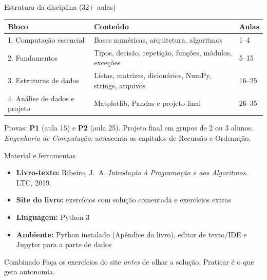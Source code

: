 \documentclass[aspectratio=169,10pt,t]{beamer}
\begin{document}
\begin{frame}{Estrutura da disciplina (32+ aulas)}
  \centering
  \small
  \begin{tabular}{@{}p{3.3cm}p{6.7cm}l@{}}
    \toprule
    \textbf{Bloco} & \textbf{Conteúdo} & \textbf{Aulas}\\
    \midrule
    1. Computação essencial & Bases numéricas, arquitetura, algoritmos & 1--4\\
    2. Fundamentos & Tipos, decisão, repetição, funções, módulos, exceções & 5--15\\
    3. Estruturas de dados & Listas, matrizes, dicionários, NumPy, strings, arquivos & 16--25\\
    4. Análise de dados e projeto & Matplotlib, Pandas e projeto final & 26--35\\
    \bottomrule
  \end{tabular}
  \vspace{2ex}

  \footnotesize Provas: \textbf{P1} (aula 15) e \textbf{P2} (aula 25). Projeto final em grupos de 2 ou 3 alunos.\\
  \emph{Engenharia de Computação:} acrescenta os capítulos de Recursão e Ordenação.
\end{frame}

\begin{frame}{Material e ferramentas}
  \begin{itemize}
    \item \textbf{Livro-texto:} Ribeiro, J.~A. \emph{Introdução à Programação e aos Algoritmos}. LTC, 2019.
    \item \textbf{Site do livro:} exercícios com solução comentada e exercícios extras
          \par\href{\siteurl}{\texttt{\siteurl}}
    \item \textbf{Linguagem:} Python 3
    \item \textbf{Ambiente:} Python instalado (Apêndice do livro), editor de texto/IDE e Jupyter para a parte de dados
  \end{itemize}
  \begin{block}{Combinado}
    Faça os exercícios do site \emph{antes} de olhar a solução. Praticar é o que gera autonomia.
  \end{block}
\end{frame}
\end{document}
